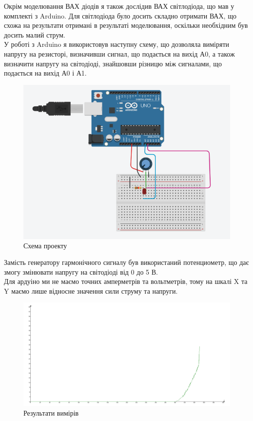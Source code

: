 \qquad Окрім моделювання ВАХ діодів я також дослідив ВАХ світлодіода, що мав у комплекті з Arduino. Для світлодіода було досить складно отримати ВАХ, що схожа на результати отримані в результаті моделювання, оскільки необхідним був досить малий струм.\\У роботі з Arduino я використовув наступну схему, що дозволяла виміряти напругу на резисторі, визначивши сигнал, що подається на вихід А0, а також визначити напругу на світодіоді, знайшовши різницю між сигналами, що подається на вихід А0 і А1.
\begin{figure}[ht]

\centering

\includegraphics[width=0.6\linewidth]{АрдуиноСхема.png}

\caption{Схема проекту}

\label{ArduinoShema}

\end{figure}

Замість генератору гармонічного сигналу був використаний потенциометр, що дає змогу змінювати напругу на світодіоді від 0 до 5 В.\\ Для ардуіно ми не маємо точних амперметрів та вольтметрів, тому на шкалі X та Y маємо лише відносне значення сили струму та напруги.
\begin{figure}[ht]

\centering

\includegraphics[width=0.8\linewidth]{Ардуино1.png}

\caption{Результати вимірів}

\label{Arduino1Rez}

\end{figure}
